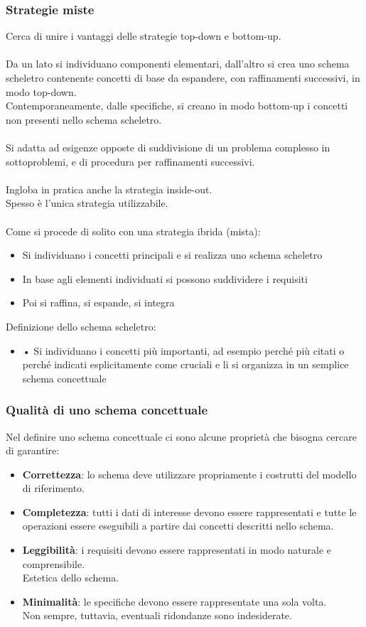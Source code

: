 \documentclass[../main.tex]{subfiles}
\begin{document}
	\subsubsection{Strategie miste}
	Cerca di unire i vantaggi delle strategie top-down e bottom-up.\\\\
	Da un lato si individuano componenti elementari, dall’altro si crea uno schema scheletro contenente concetti di base da espandere, con raffinamenti successivi, in modo top-down.\\
	Contemporaneamente, dalle specifiche, si creano in modo bottom-up i concetti non presenti nello schema scheletro.\\\\
	Si adatta ad esigenze opposte di suddivisione di un problema complesso in sottoproblemi, e di procedura per raffinamenti successivi.\\\\
	Ingloba in pratica anche la strategia inside-out.\\
	Spesso è l’unica strategia utilizzabile.\\\\
	Come si procede di solito con una strategia ibrida (mista):
	\begin{itemize}
		\item Si individuano i concetti principali e si realizza uno schema scheletro
		\item In base agli elementi individuati si possono suddividere i requisiti
		\item Poi si raffina, si espande, si integra
	\end{itemize}
	Definizione dello schema scheletro:
	\begin{itemize}
		\item • Si individuano i concetti più importanti, ad esempio perché più citati o perché indicati esplicitamente come cruciali e li si organizza in un semplice schema concettuale
	\end{itemize}
	\subsubsection{Qualità di uno schema concettuale}
	Nel definire uno schema concettuale ci sono alcune proprietà che bisogna cercare di garantire:
	\begin{itemize}
		\item \textbf{Correttezza}: lo schema deve utilizzare propriamente i costrutti del modello di riferimento.
		\item \textbf{Completezza}: tutti i dati di interesse devono essere rappresentati e tutte le operazioni essere eseguibili a partire dai concetti descritti nello schema.
		\item \textbf{Leggibilità}: i requisiti devono essere rappresentati in modo naturale e comprensibile. \\
		Estetica dello schema.
		\item \textbf{Minimalità}: le specifiche devono essere rappresentate una sola volta. \\
		Non sempre, tuttavia, eventuali ridondanze sono indesiderate.
	\end{itemize}
\end{document}
